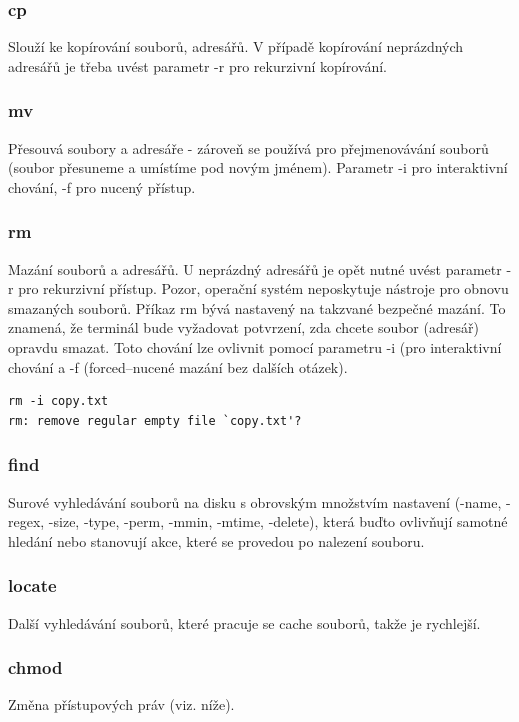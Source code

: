 \documentclass{article}
\begin{document}
\subsubsection{cp}
Slouží ke kopírování souborů, adresářů. V případě kopírování neprázdných adresářů je třeba uvést parametr -r pro rekurzivní kopírování.

\subsubsection{mv}
Přesouvá soubory a adresáře - zároveň se používá pro přejmenovávání souborů (soubor přesuneme a umístíme pod novým jménem). Parametr -i pro interaktivní chování, -f pro nucený přístup.

\subsubsection{rm}
Mazání souborů a adresářů. U neprázdný adresářů je opět nutné uvést parametr -r pro rekurzivní přístup. Pozor, operační systém neposkytuje nástroje pro obnovu smazaných souborů. Příkaz rm bývá nastavený na takzvané bezpečné mazání. To znamená, že terminál bude vyžadovat potvrzení, zda chcete soubor (adresář) opravdu smazat. Toto chování lze ovlivnit pomocí parametru -i (pro interaktivní chování a -f (forced--nucené mazání bez dalších otázek).

\begin{verbatim}
rm -i copy.txt
rm: remove regular empty file `copy.txt'? 
\end{verbatim}

\subsubsection{find}
Surové vyhledávání souborů na disku s obrovským množstvím nastavení (-name, -regex, -size, -type, -perm, -mmin, -mtime, -delete), která buďto ovlivňují samotné hledání nebo stanovují akce, které se provedou po nalezení souboru.

\subsubsection{locate}
Další vyhledávání souborů, které pracuje se cache souborů, takže je rychlejší.

\subsubsection{chmod}
Změna přístupových práv (viz. níže).
\end{document}
